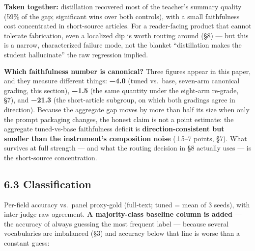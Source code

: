 \documentclass[11pt]{article}
\begin{document}
\textbf{Taken together:} distillation recovered most of the teacher's
summary quality (59\% of the gap; significant wins over both controls),
with a small faithfulness cost concentrated in short-source articles.
For a reader-facing product that cannot tolerate fabrication, even a
localized dip is worth routing around (§8) --- but this is a narrow,
characterized failure mode, not the blanket ``distillation makes the
student hallucinate'' the raw regression implied.

\textbf{Which faithfulness number is canonical?} Three figures appear in
this paper, and they measure different things: \textbf{−4.0} (tuned
vs.~base, seven-arm canonical grading, this section), \textbf{−1.5} (the
same quantity under the eight-arm re-grade, §7), and \textbf{−21.3} (the
short-article subgroup, on which both gradings agree in direction).
Because the aggregate gap moves by more than half its size when only the
prompt packaging changes, the honest claim is not a point estimate: the
aggregate tuned-vs-base faithfulness deficit is
\textbf{direction-consistent but smaller than the instrument's
composition noise} (±5--7 points, §7). What survives at full strength
--- and what the routing decision in §8 actually uses --- is the
short-source concentration.

\subsection{6.3 Classification}\label{classification}

Per-field accuracy vs.~panel proxy-gold (full-text; tuned = mean of 3
seeds), with inter-judge raw agreement. \textbf{A majority-class
baseline column is added} --- the accuracy of always guessing the most
frequent label --- because several vocabularies are imbalanced (§3) and
accuracy below that line is worse than a constant guess:
\end{document}
